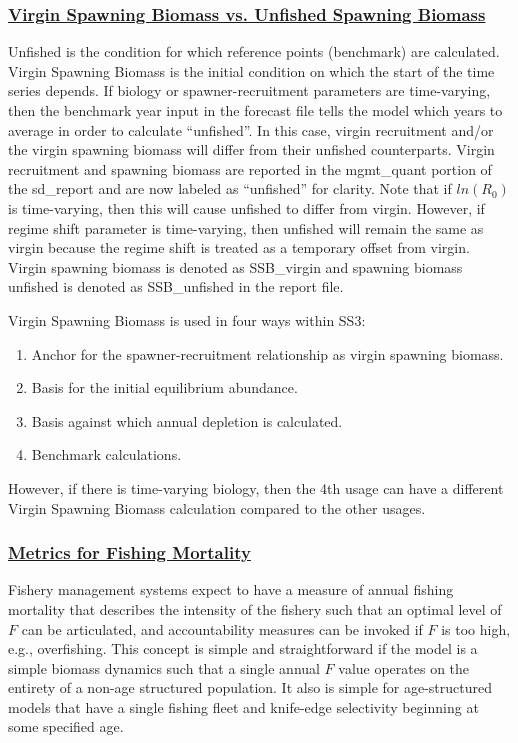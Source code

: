 \hypertarget{VirginUnfished}{}
\subsubsection[Virgin Spawning Biomass vs. Unfished Spawning Biomass]{\protect\hyperlink{VirginUnfished}{Virgin Spawning Biomass vs. Unfished Spawning Biomass}}
Unfished is the condition for which reference points (benchmark) are calculated. Virgin Spawning Biomass is the initial condition on which the start of the time series depends. If biology or spawner-recruitment parameters are time-varying, then the benchmark year input in the forecast file tells the model which years to average in order to calculate ``unfished''. In this case, virgin recruitment and/or the virgin spawning biomass will differ from their unfished counterparts. Virgin recruitment and spawning biomass are reported in the mgmt\_quant portion of the sd\_report and are now labeled as ``unfished'' for clarity. Note that if $ln(R_{0})$ is time-varying, then this will cause unfished to differ from virgin. However, if regime shift parameter is time-varying, then unfished will remain the same as virgin because the regime shift is treated as a temporary offset from virgin. Virgin spawning biomass is denoted as SSB\_virgin and spawning biomass unfished is denoted as SSB\_unfished in the report file.

Virgin Spawning Biomass is used in four ways within SS3:
\begin{enumerate}
	\item Anchor for the spawner-recruitment relationship as virgin spawning biomass.
	\item Basis for the initial equilibrium abundance. 
	\item Basis against which annual depletion is calculated.
	\item Benchmark calculations.
\end{enumerate}
However, if there is time-varying biology, then the 4th usage can have a different Virgin Spawning Biomass calculation compared to the other usages.

\hypertarget{FMortality}{}
\subsubsection[Metrics for Fishing Mortality]{\protect\hyperlink{FMortality}{Metrics for Fishing Mortality}}
Fishery management systems expect to have a measure of annual fishing mortality that describes the intensity of the fishery such that an optimal level of $F$ can be articulated, and accountability measures can be invoked if $F$ is too high, e.g., overfishing. This concept is simple and straightforward if the model is a simple biomass dynamics such that a single annual $F$ value operates on the entirety of a non-age structured population. It also is simple for age-structured models that have a single fishing fleet and knife-edge selectivity beginning at some specified age.

